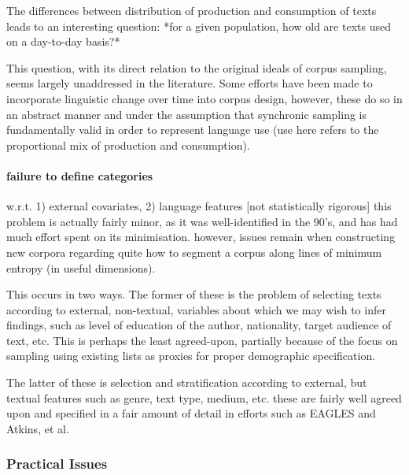 The differences between distribution of production and consumption of texts leads to an interesting question: *for a given population, how old are texts used on a day-to-day basis?*

This question, with its direct relation to the original ideals of corpus sampling, seems largely unaddressed in the literature. Some efforts have been made to incorporate linguistic change over time into corpus design, however, these do so in an abstract manner and under the assumption that synchronic sampling is fundamentally valid in order to represent language use (use here refers to the proportional mix of production and consumption).







\paragraph{ failure to define categories }
w.r.t. 1) external covariates, 2) language features [not statistically rigorous]
this problem is actually fairly minor, as it was well-identified in the 90's, and has had much effort spent on its minimisation.  however, issues remain when constructing new corpora regarding quite how to segment a corpus along lines of minimum entropy (in useful dimensions).

This occurs in two ways. The former of these is the problem of selecting texts according to external, non-textual, variables about which we may wish to infer findings, such as level of education of the author, nationality, target audience of text, etc. This is perhaps the least agreed-upon, partially because of the focus on sampling using existing lists as proxies for proper demographic specification.

The latter of these is selection and stratification according to external, but textual features such as genre, text type, medium, etc. these are fairly well agreed upon and specified in a fair amount of detail in efforts such as EAGLES and Atkins, et al.  








\subsubsection{Practical Issues}

